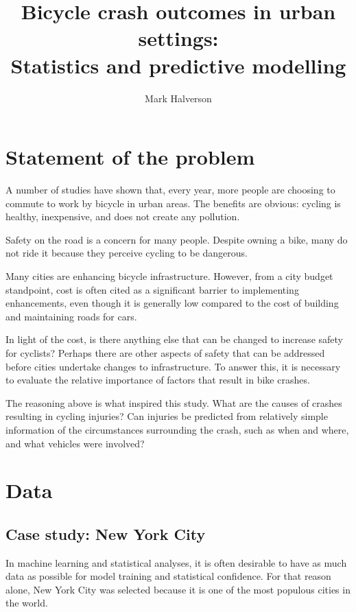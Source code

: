 \documentclass[twocolumn,oneside]{article}
\title{\vspace{-1.0cm}Bicycle crash outcomes in urban settings:\\
       Statistics and predictive modelling}
\author{Mark Halverson}
\begin{document}
\maketitle


\section{Statement of the problem}

A number of studies have shown that, every year, more people are
choosing to commute to work by bicycle in urban areas.  The benefits
are obvious: cycling is healthy, inexpensive, and does not create any
pollution.

Safety on the road is a concern for many people.  Despite owning a
bike, many do not ride it because they perceive cycling to be
dangerous.

Many cities are enhancing bicycle infrastructure.  However, from a
city budget standpoint, cost is often cited as a significant barrier
to implementing enhancements, even though it is generally low compared
to the cost of building and maintaining roads for cars.

In light of the cost, is there anything else that can be changed to
increase safety for cyclists?  Perhaps there are other aspects of
safety that can be addressed before cities undertake changes to
infrastructure.  To answer this, it is necessary to evaluate the
relative importance of factors that result in bike crashes.

The reasoning above is what inspired this study.  What are the causes
of crashes resulting in cycling injuries?  Can injuries be predicted
from relatively simple information of the circumstances surrounding
the crash, such as when and where, and what vehicles were involved?

\section{Data}

\subsection{Case study: New York City}

In machine learning and statistical analyses, it is often desirable to
have as much data as possible for model training and statistical
confidence.  For that reason alone, New York City was selected because
it is one of the most populous cities in the world.
\end{document}
